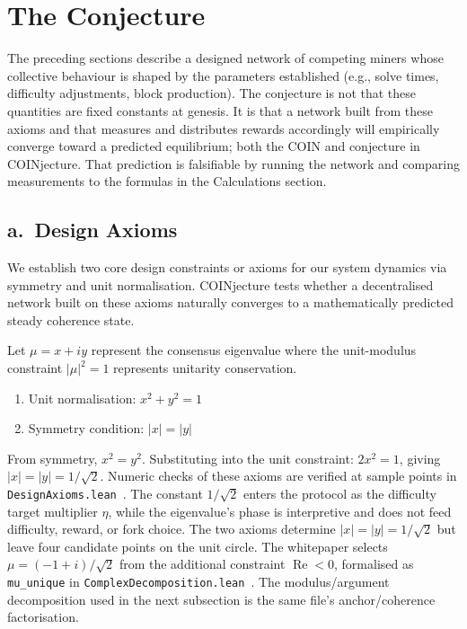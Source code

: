 \documentclass[12pt,letterpaper]{article}
\begin{document}
\section*{The Conjecture}

The preceding sections describe a designed network of competing miners whose collective behaviour is
shaped by the parameters established (e.g., solve times, difficulty adjustments, block production). The
conjecture is not that these quantities are fixed constants at genesis. It is that a network built from these
axioms and that measures and distributes rewards accordingly will empirically converge toward a
predicted equilibrium; both the COIN and conjecture in COINjecture. That prediction is falsifiable by
running the network and comparing measurements to the formulas in the Calculations section.

\subsection*{a.\ Design Axioms}

We establish two core design constraints or axioms for our system dynamics via symmetry and unit
normalisation. COINjecture tests whether a decentralised network built on these axioms naturally
converges to a mathematically predicted steady coherence state.

Let $\mu = x + iy$ represent the consensus eigenvalue where the unit-modulus constraint $|\mu|^2 = 1$
represents unitarity conservation.

\begin{enumerate}[leftmargin=2em,itemsep=2pt]
  \item Unit normalisation: $x^2 + y^2 = 1$
  \item Symmetry condition: $|x| = |y|$
\end{enumerate}

From symmetry, $x^2 = y^2$. Substituting into the unit constraint: $2x^2 = 1$, giving
$|x| = |y| = 1/\sqrt{2}$. Numeric checks of these axioms are verified at sample points in
\texttt{DesignAxioms.lean}~\cite{designaxioms_lean}. The constant $1/\sqrt{2}$ enters the protocol as
the difficulty target multiplier $\eta$, while the eigenvalue's phase is interpretive and does not feed
difficulty, reward, or fork choice.
The two axioms determine $|x| = |y| = 1/\sqrt{2}$ but leave four candidate points on the unit circle.
The whitepaper selects $\mu = (-1 + i)/\sqrt{2}$ from the additional constraint $\operatorname{Re} < 0$,
formalised as \texttt{mu\_unique} in \texttt{ComplexDecomposition.lean}~\cite{complexdecomp_lean}.
The modulus/argument decomposition used in the next subsection is the same file's anchor/coherence
factorisation.
\end{document}
